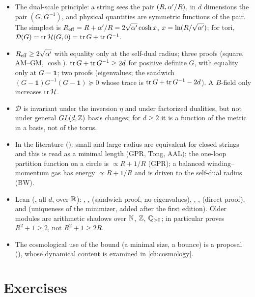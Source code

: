 \begin{summarybox}
\begin{itemize}[leftmargin=*]
\item The dual-scale principle: a string sees the pair $(R,\alpha'/R)$, in $d$ dimensions the pair
 $(G,G^{-1})$, and physical quantities are symmetric functions of the pair. The simplest is
 $R_{\rm eff}=R+\alpha'/R=2\sqrt{\alpha'}\cosh x$, $x=\ln(R/\sqrt{\alpha'})$; for tori,
 $\mathcal D(G)=\operatorname{tr}\mathcal{H}(G,0)=\operatorname{tr} G+\operatorname{tr} G^{-1}$.
\item $R_{\rm eff}\ge2\sqrt{\alpha'}$ with equality only at the self-dual radius; three proofs
 (square, AM--GM, $\cosh$). $\operatorname{tr} G+\operatorname{tr} G^{-1}\ge2d$ for positive definite $G$, with equality
 only at $G=\mathbf1$; two proofs (eigenvalues; the sandwich
 $(G-\mathbf1)G^{-1}(G-\mathbf1)\succeq0$ whose trace is $\operatorname{tr} G+\operatorname{tr} G^{-1}-2d$). A $B$-field
 only increases $\operatorname{tr}\mathcal{H}$.
\item $\mathcal D$ is invariant under the inversion $\eta$ and under factorized dualities,
 but not under general $GL(d,\mathbb{Z})$ basis changes; for $d\ge2$ it is a function of the metric
 in a basis, not of the torus.
\item In the literature (\TL): small and large radius are equivalent for closed strings and
 this is read as a minimal length (GPR, Tong, AAL); the one-loop partition function on a
 circle is $\propto R+1/R$ (GPR); a balanced winding--momentum gas has energy
 $\propto R+1/R$ and is driven to the self-dual radius (BW).
\item Lean (\TA, all $d$, over $\mathbb{R}$): , ,
  (sandwich proof, no eigenvalues), ,
 ,  (direct proof), and
  (uniqueness of the minimizer, added after the first edition). Older modules are arithmetic shadows over
 $\mathbb{N}$, $\mathbb{Z}$, $\mathbb{Q}_{>0}$; in particular  proves
 $R^2+1\ge2$, not $R^2+1\ge2R$.
\item The cosmological use of the bound (a minimal size, a bounce) is a proposal (\TC), whose
 dynamical content is examined in \cref{ch:cosmology}.
\end{itemize}
\end{summarybox}

\section*{Exercises}


